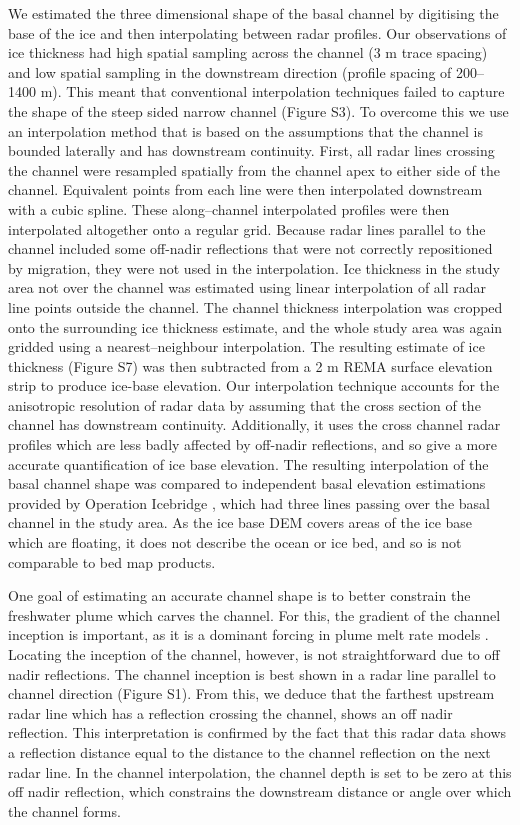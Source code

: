 We estimated the three dimensional shape of the basal channel by digitising the base of the ice and then interpolating between radar profiles. Our observations of ice thickness had high spatial sampling across the channel (3 m trace spacing) and low spatial sampling in the downstream direction (profile spacing of 200--1400 m). This meant that conventional interpolation techniques failed to capture the shape of the steep sided narrow channel (Figure S3). To overcome this we use an interpolation method that is based on the assumptions that the channel is bounded laterally and has downstream continuity. First, all radar lines crossing  the channel were resampled spatially from the channel apex to either side of the channel. Equivalent points from each line were then interpolated downstream with a cubic spline. These along--channel interpolated  profiles were then interpolated altogether onto a regular grid.  Because radar lines parallel to the channel included some off-nadir reflections that were not correctly repositioned by migration, they were not used in the interpolation. Ice thickness in the study area not over the channel was estimated using linear interpolation of all radar line points outside the channel. The channel thickness interpolation was cropped onto the surrounding ice thickness estimate, and the whole study area was again gridded using a nearest--neighbour interpolation. The resulting estimate of ice thickness (Figure S7) was then subtracted from a 2 m REMA surface elevation strip to produce ice-base elevation.
Our interpolation technique accounts for the anisotropic resolution of radar data by assuming that the cross section of the channel has downstream continuity. Additionally, it uses the cross channel radar profiles which are less badly affected by off-nadir reflections, and so give a more accurate quantification of ice base elevation. 
The resulting interpolation of the basal channel shape was compared to  independent basal elevation estimations provided by Operation Icebridge \citep{studinger2010operation}, which had three lines passing over the basal channel in the study area.  As the ice base DEM covers areas of the ice base which are floating, it does not describe the ocean or ice bed, and so is not comparable to bed map products.

One goal of estimating an accurate channel shape is to better constrain the freshwater plume which carves the channel. For this, the gradient of the channel inception is important, as it is a dominant forcing in plume melt rate models \citep{jenkins1991one}. Locating the inception of the channel, however, is not straightforward due to off nadir reflections. The channel inception is best shown in a radar line parallel to channel direction (Figure S1). From this, we deduce that the farthest upstream radar line which has a reflection crossing the channel, shows an off nadir reflection. This interpretation is confirmed by the fact that this radar data shows a reflection distance equal to the distance to the channel reflection on the next radar line.  In the channel interpolation, the channel depth is set to be zero at this off nadir reflection, which constrains the downstream distance or angle over which the channel forms.



